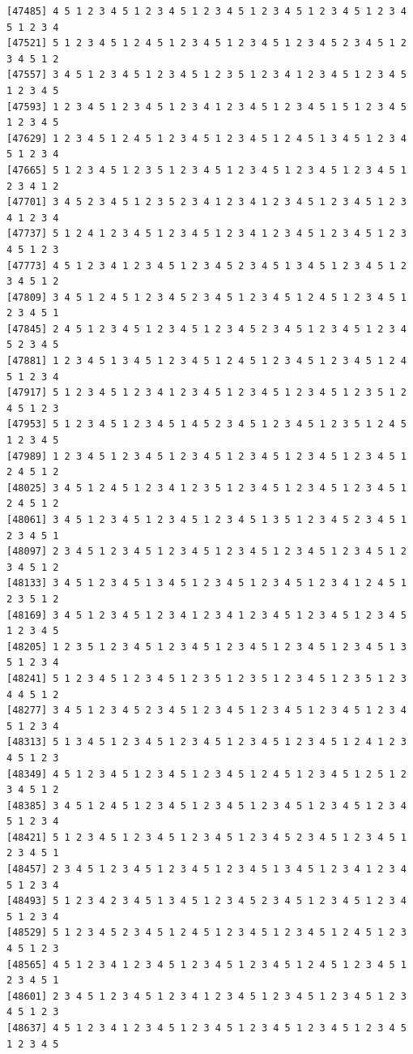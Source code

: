 \documentclass[
  11pt,
]{book}
\begin{document}
\begin{verbatim}
[47485] 4 5 1 2 3 4 5 1 2 3 4 5 1 2 3 4 5 1 2 3 4 5 1 2 3 4 5 1 2 3 4 5 1 2 3 4
[47521] 5 1 2 3 4 5 1 2 4 5 1 2 3 4 5 1 2 3 4 5 1 2 3 4 5 2 3 4 5 1 2 3 4 5 1 2
[47557] 3 4 5 1 2 3 4 5 1 2 3 4 5 1 2 3 5 1 2 3 4 1 2 3 4 5 1 2 3 4 5 1 2 3 4 5
[47593] 1 2 3 4 5 1 2 3 4 5 1 2 3 4 1 2 3 4 5 1 2 3 4 5 1 5 1 2 3 4 5 1 2 3 4 5
[47629] 1 2 3 4 5 1 2 4 5 1 2 3 4 5 1 2 3 4 5 1 2 4 5 1 3 4 5 1 2 3 4 5 1 2 3 4
[47665] 5 1 2 3 4 5 1 2 3 5 1 2 3 4 5 1 2 3 4 5 1 2 3 4 5 1 2 3 4 5 1 2 3 4 1 2
[47701] 3 4 5 2 3 4 5 1 2 3 5 2 3 4 1 2 3 4 1 2 3 4 5 1 2 3 4 5 1 2 3 4 1 2 3 4
[47737] 5 1 2 4 1 2 3 4 5 1 2 3 4 5 1 2 3 4 1 2 3 4 5 1 2 3 4 5 1 2 3 4 5 1 2 3
[47773] 4 5 1 2 3 4 1 2 3 4 5 1 2 3 4 5 2 3 4 5 1 3 4 5 1 2 3 4 5 1 2 3 4 5 1 2
[47809] 3 4 5 1 2 4 5 1 2 3 4 5 2 3 4 5 1 2 3 4 5 1 2 4 5 1 2 3 4 5 1 2 3 4 5 1
[47845] 2 4 5 1 2 3 4 5 1 2 3 4 5 1 2 3 4 5 2 3 4 5 1 2 3 4 5 1 2 3 4 5 2 3 4 5
[47881] 1 2 3 4 5 1 3 4 5 1 2 3 4 5 1 2 4 5 1 2 3 4 5 1 2 3 4 5 1 2 4 5 1 2 3 4
[47917] 5 1 2 3 4 5 1 2 3 4 1 2 3 4 5 1 2 3 4 5 1 2 3 4 5 1 2 3 5 1 2 4 5 1 2 3
[47953] 5 1 2 3 4 5 1 2 3 4 5 1 4 5 2 3 4 5 1 2 3 4 5 1 2 3 5 1 2 4 5 1 2 3 4 5
[47989] 1 2 3 4 5 1 2 3 4 5 1 2 3 4 5 1 2 3 4 5 1 2 3 4 5 1 2 3 4 5 1 2 4 5 1 2
[48025] 3 4 5 1 2 4 5 1 2 3 4 1 2 3 5 1 2 3 4 5 1 2 3 4 5 1 2 3 4 5 1 2 4 5 1 2
[48061] 3 4 5 1 2 3 4 5 1 2 3 4 5 1 2 3 4 5 1 3 5 1 2 3 4 5 2 3 4 5 1 2 3 4 5 1
[48097] 2 3 4 5 1 2 3 4 5 1 2 3 4 5 1 2 3 4 5 1 2 3 4 5 1 2 3 4 5 1 2 3 4 5 1 2
[48133] 3 4 5 1 2 3 4 5 1 3 4 5 1 2 3 4 5 1 2 3 4 5 1 2 3 4 1 2 4 5 1 2 3 5 1 2
[48169] 3 4 5 1 2 3 4 5 1 2 3 4 1 2 3 4 1 2 3 4 5 1 2 3 4 5 1 2 3 4 5 1 2 3 4 5
[48205] 1 2 3 5 1 2 3 4 5 1 2 3 4 5 1 2 3 4 5 1 2 3 4 5 1 2 3 4 5 1 3 5 1 2 3 4
[48241] 5 1 2 3 4 5 1 2 3 4 5 1 2 3 5 1 2 3 5 1 2 3 4 5 1 2 3 5 1 2 3 4 4 5 1 2
[48277] 3 4 5 1 2 3 4 5 2 3 4 5 1 2 3 4 5 1 2 3 4 5 1 2 3 4 5 1 2 3 4 5 1 2 3 4
[48313] 5 1 3 4 5 1 2 3 4 5 1 2 3 4 5 1 2 3 4 5 1 2 3 4 5 1 2 4 1 2 3 4 5 1 2 3
[48349] 4 5 1 2 3 4 5 1 2 3 4 5 1 2 3 4 5 1 2 4 5 1 2 3 4 5 1 2 5 1 2 3 4 5 1 2
[48385] 3 4 5 1 2 4 5 1 2 3 4 5 1 2 3 4 5 1 2 3 4 5 1 2 3 4 5 1 2 3 4 5 1 2 3 4
[48421] 5 1 2 3 4 5 1 2 3 4 5 1 2 3 4 5 1 2 3 4 5 2 3 4 5 1 2 3 4 5 1 2 3 4 5 1
[48457] 2 3 4 5 1 2 3 4 5 1 2 3 4 5 1 2 3 4 5 1 3 4 5 1 2 3 4 1 2 3 4 5 1 2 3 4
[48493] 5 1 2 3 4 2 3 4 5 1 3 4 5 1 2 3 4 5 2 3 4 5 1 2 3 4 5 1 2 3 4 5 1 2 3 4
[48529] 5 1 2 3 4 5 2 3 4 5 1 2 4 5 1 2 3 4 5 1 2 3 4 5 1 2 4 5 1 2 3 4 5 1 2 3
[48565] 4 5 1 2 3 4 1 2 3 4 5 1 2 3 4 5 1 2 3 4 5 1 2 4 5 1 2 3 4 5 1 2 3 4 5 1
[48601] 2 3 4 5 1 2 3 4 5 1 2 3 4 1 2 3 4 5 1 2 3 4 5 1 2 3 4 5 1 2 3 4 5 1 2 3
[48637] 4 5 1 2 3 4 1 2 3 4 5 1 2 3 4 5 1 2 3 4 5 1 2 3 4 5 1 2 3 4 5 1 2 3 4 5

\end{verbatim}
\end{document}
